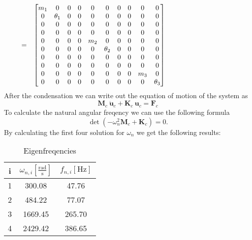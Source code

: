 \documentclass[12pt]{article}
\begin{document}
\begin{equation*}
	\hspace{-6 cm}
	\begin{aligned}
	\text{Where} \quad 
	\begin{array}{|l@{} c l}
M_{disk} &~=& \begin{bmatrix}
m_1 & 0 & 0 & 0 & 0 & 0 & 0 & 0 & 0 & 0 \\
0 & \theta_1 & 0 & 0 & 0 & 0 & 0 & 0 & 0 & 0 \\
0 & 0 & 0 & 0 & 0 & 0 & 0 & 0 & 0 & 0 \\
0 & 0 & 0 & 0 & 0 & 0 & 0 & 0 & 0 & 0 \\
0 & 0 & 0 & 0 & m_2 & 0 & 0 & 0 & 0 & 0 \\
0 & 0 & 0 & 0 & 0 & \theta_2 & 0 & 0 & 0 & 0 \\
0 & 0 & 0 & 0 & 0 & 0 & 0 & 0 & 0 & 0 \\
0 & 0 & 0 & 0 & 0 & 0 & 0 & 0 & 0 & 0 \\
0 & 0 & 0 & 0 & 0 & 0 & 0 & 0 & m_3 & 0 \\
0 & 0 & 0 & 0 & 0 & 0 & 0 & 0 & 0 & \theta_3
\end{bmatrix}
	\end{array}
	\end{aligned}
\end{equation*}
After the condensation we can write out the equation of motion of the system as
\begin{equation}
\textbf{M}_c~\ddot{\textbf{u}}_c + \textbf{K}_c ~ \textbf{u}_c = \textbf{F}_c
\end{equation}
To calculate the natural angular freqency we can use the following formula
\begin{equation}
\det \left( -\omega_n^2 \textbf{M}_c + \textbf{K}_c \right)=0.
\end{equation}
By calculating the first four solution for $\omega_n$ we get the following results:
\begin{table}[hbt]
\label{tab:disc} 
\centering
\caption{Eigenfreqencies} %
\label{tab:freq_sol}
\begin{tabular}{ c c c }
 i & $\omega_{n,i} \left[ \frac{\text{rad}}{\text{s}} \right]$ &  $ f_{n,i} \left[ \text{Hz} \right]$ \\[0.2cm]
 \hline
 1 & 300.08 & 47.76 \\
 2 & 484.22 & 77.07 \\
 3 & 1669.45 & 265.70 \\
 4 & 2429.42 & 386.65 \\
\end{tabular}
\end{table}
\end{document}
